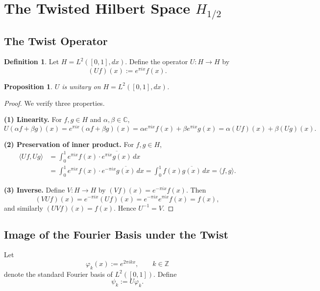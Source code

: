 \documentclass[11pt]{amsart}
\newtheorem{proposition}[theorem]{Proposition}
\theoremstyle{definition}
\newtheorem{definition}[theorem]{Definition}
\theoremstyle{remark}
\begin{document}
\section{The Twisted Hilbert Space \texorpdfstring{$H_{1/2}$}{H{1/2}}}

\label{sec:twisted-hilbert}

\subsection{The Twist Operator}

\begin{definition}
Let $H = L^2([0,1], dx)$. Define the operator $U : H \to H$ by
\[
(Uf)(x) := e^{\pi i x} f(x).
\]
\end{definition}

\begin{proposition}
\label{prop:unitary-U}
$U$ is unitary on $H = L^2([0,1], dx)$.
\end{proposition}

\begin{proof}
We verify three properties.

\textbf{(1) Linearity.}
For $f, g \in H$ and $\alpha, \beta \in \mathbb{C}$,
\[
U(\alpha f + \beta g)(x) = e^{\pi i x}(\alpha f + \beta g)(x) = \alpha e^{\pi i x} f(x) + \beta e^{\pi i x} g(x) = \alpha (Uf)(x) + \beta (Ug)(x).
\]

\textbf{(2) Preservation of inner product.}
For $f, g \in H$,
\begin{align*}
\langle Uf, Ug \rangle &= \int_{0}^{1} e^{\pi i x} f(x) \cdot \overline{e^{\pi i x} g(x)} \, dx \\
&= \int_{0}^{1} e^{\pi i x} f(x) \cdot e^{-\pi i x} \overline{g(x)} \, dx = \int_{0}^{1} f(x) \overline{g(x)} \, dx = \langle f, g \rangle.
\end{align*}

\textbf{(3) Inverse.}
Define $V : H \to H$ by $(Vf)(x) = e^{-\pi i x} f(x)$. Then
\[
(VU f)(x) = e^{-\pi i x} (Uf)(x) = e^{-\pi i x} e^{\pi i x} f(x) = f(x),
\]
and similarly $(UV f)(x) = f(x)$. Hence $U^{-1} = V$.
\end{proof}

\subsection{Image of the Fourier Basis under the Twist}

Let
\[
\varphi_k(x) := e^{2\pi i k x}, \qquad k \in \mathbb{Z}
\]
denote the standard Fourier basis of $L^2([0,1])$. Define
\[
\psi_k := U\varphi_k.
\]
\end{document}
